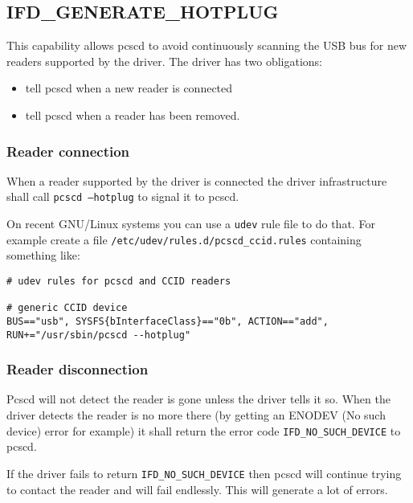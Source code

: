 \documentclass[a4paper,12pt]{article}
\begin{document}
\subsection{IFD\_GENERATE\_HOTPLUG}
\label{IFD_GENERATE_HOTPLUG}

This capability allows pcscd to avoid continuously scanning the USB bus for
new readers supported by the driver. The driver has two obligations:
\begin{itemize}
\item tell pcscd when a new reader is connected

\item tell pcscd when a reader has been removed.

\end{itemize}


\subsubsection{Reader connection}

When a reader supported by the driver is connected the driver
infrastructure shall call \texttt{pcscd --hotplug} to signal it to pcscd.

On recent GNU/Linux systems you can use a \texttt{udev} rule file to do
that.  For example create a file
\texttt{/etc/udev/rules.d/pcscd\_ccid.rules} containing something like:

\begin{verbatim}
# udev rules for pcscd and CCID readers

# generic CCID device
BUS=="usb", SYSFS{bInterfaceClass}=="0b", ACTION=="add", RUN+="/usr/sbin/pcscd --hotplug"
\end{verbatim}


\subsubsection{Reader disconnection}

Pcscd will not detect the reader is gone unless the driver tells it so.
When the driver detects the reader is no more there (by getting an ENODEV
(No such device) error for example) it shall return the error code
\texttt{IFD\_NO\_SUCH\_DEVICE} to pcscd.

If the driver fails to return \texttt{IFD\_NO\_SUCH\_DEVICE} then pcscd
will continue trying to contact the reader and will fail endlessly. This
will generate a lot of errors.
\end{document}

